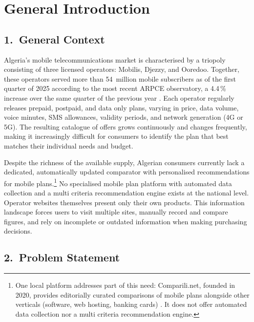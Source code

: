 
\chapter*{General Introduction}

\section*{1.~General Context}

Algeria's mobile telecommunications market is characterised by a triopoly consisting of three licensed operators: Mobilis, Djezzy, and Ooredoo. Together, these operators served more than 54~million mobile subscribers as of the first quarter of 2025 according to the most recent ARPCE observatory, a 4.4\,\% increase over the same quarter of the previous year \parencite{ARPCE2025, ARPCE2024}. Each operator regularly releases prepaid, postpaid, and data only plans, varying in price, data volume, voice minutes, SMS allowances, validity periods, and network generation (4G or 5G). The resulting catalogue of offers grows continuously and changes frequently, making it increasingly difficult for consumers to identify the plan that best matches their individual needs and budget.

Despite the richness of the available supply, Algerian consumers currently lack a dedicated, automatically updated comparator with personalised recommendations for mobile plans.\footnote{One local platform addresses part of this need: Comparili.net, founded in 2020, provides editorially curated comparisons of mobile plans alongside other verticals (software, web hosting, banking cards) \parencite{Comparili2024}. It does not offer automated data collection nor a multi criteria recommendation engine.} No specialised mobile plan platform with automated data collection and a multi criteria recommendation engine exists at the national level. Operator websites themselves present only their own products. This information landscape forces users to visit multiple sites, manually record and compare figures, and rely on incomplete or outdated information when making purchasing decisions.

\section*{2.~Problem Statement}

